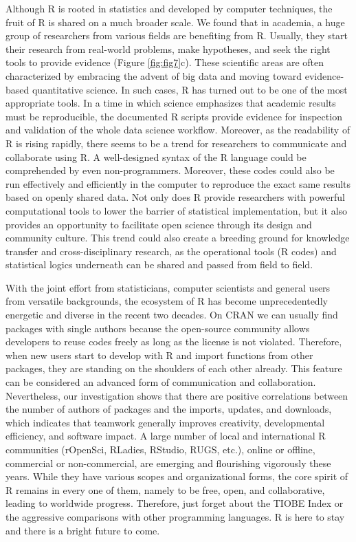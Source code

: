 Although R is rooted in statistics and developed by computer techniques,
the fruit of R is shared on a much broader scale. We found that in
academia, a huge group of researchers from various fields are benefiting
from R. Usually, they start their research from real-world problems,
make hypotheses, and seek the right tools to provide evidence (Figure
\ref{fig:fig7}c). These scientific areas are often characterized by
embracing the advent of big data and moving toward evidence-based
quantitative science. In such cases, R has turned out to be one of the
most appropriate tools. In a time in which science emphasizes that
academic results must be reproducible, the documented R scripts provide
evidence for inspection and validation of the whole data science
workflow. Moreover, as the readability of R is rising rapidly, there
seems to be a trend for researchers to communicate and collaborate using
R. A well-designed syntax of the R language could be comprehended by
even non-programmers. Moreover, these codes could also be run
effectively and efficiently in the computer to reproduce the exact same
results based on openly shared data. Not only does R provide researchers
with powerful computational tools to lower the barrier of statistical
implementation, but it also provides an opportunity to facilitate open
science through its design and community culture. This trend could also
create a breeding ground for knowledge transfer and cross-disciplinary
research, as the operational tools (R codes) and statistical logics
underneath can be shared and passed from field to field.

With the joint effort from statisticians, computer scientists and
general users from versatile backgrounds, the ecosystem of R has become
unprecedentedly energetic and diverse in the recent two decades. On CRAN
we can usually find packages with single authors because the open-source
community allows developers to reuse codes freely as long as the license
is not violated. Therefore, when new users start to develop with R and
import functions from other packages, they are standing on the shoulders
of each other already. This feature can be considered an advanced form
of communication and collaboration. Nevertheless, our investigation
shows that there are positive correlations between the number of authors
of packages and the imports, updates, and downloads, which indicates
that teamwork generally improves creativity, developmental efficiency,
and software impact. A large number of local and international R
communities (rOpenSci, RLadies, RStudio, RUGS, etc.), online or offline,
commercial or non-commercial, are emerging and flourishing vigorously
these years. While they have various scopes and organizational forms,
the core spirit of R remains in every one of them, namely to be free,
open, and collaborative, leading to worldwide progress. Therefore, just
forget about the TIOBE Index or the aggressive comparisons with other
programming languages. R is here to stay and there is a bright future to
come.

